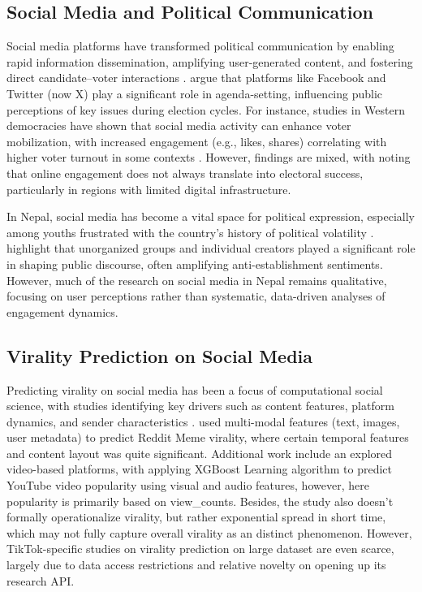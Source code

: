 \documentclass[12pt,a4paper]{report}
\begin{document}
\subsection{Social Media and Political Communication}

Social media platforms have transformed political communication by enabling rapid information dissemination, amplifying user-generated content, and fostering direct candidate–voter interactions \parencite{van2013socialmedia}. \parencite{mcgregor2019socialmediaelections} argue that platforms like Facebook and Twitter (now X) play a significant role in agenda-setting, influencing public perceptions of key issues during election cycles. For instance, studies in Western democracies have shown that social media activity can enhance voter mobilization, with increased engagement (e.g., likes, shares) correlating with higher voter turnout in some contexts \parencite{bode2016campaign}. However, findings are mixed, with \parencite{piatak2021does} noting that online engagement does not always translate into electoral success, particularly in regions with limited digital infrastructure.

In Nepal, social media has become a vital space for political expression, especially among youths frustrated with the country’s history of political volatility \parencite{bhandari2024weaponizing}. \parencite{dahal2023influence} highlight that unorganized groups and individual creators played a significant role in shaping public discourse, often amplifying anti-establishment sentiments. However, much of the research on social media in Nepal remains qualitative, focusing on user perceptions rather than systematic, data-driven analyses of engagement dynamics. 

\newpage
\subsection{Virality Prediction on Social Media}

Predicting virality on social media has been a focus of computational social science, with studies identifying key drivers such as content features, platform dynamics, and sender characteristics \parencite{berger2012viral}. \parencite{SahJordan2025DecodingReddit} used multi-modal features (text, images, user metadata) to predict Reddit Meme virality, where certain temporal features and content layout was quite significant. Additional work include an  explored video-based platforms, with \parencite{nisa2021optimizing} applying XGBoost Learning algorithm to predict YouTube video popularity using visual and audio features, however, here popularity is primarily based on view\_counts. Besides, the study also doesn't formally operationalize virality, but rather exponential spread in short time, which may not fully capture overall virality as an distinct phenomenon. However, TikTok-specific studies on virality prediction on large dataset are even scarce, largely due to data access restrictions and relative novelty on opening up its research API.
\end{document}
